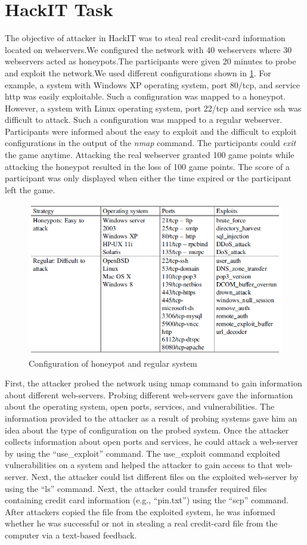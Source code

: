 \section{HackIT Task}
The objective of attacker in HackIT was to steal real credit-card information located on webservers.We configured the network with 40 webservers where 30 webservers acted as honeypots.The participants were given 20 minutes to probe and exploit the network.We used different configurations shown in \ref{fig:figure7}. For example, a system with Windows XP operating system, port 80/tcp, and service http was easily exploitable. Such a configuration was mapped to a honeypot. However, a system with Linux operating system, port 22/tcp and service ssh was difficult to
attack. Such a configuration was mapped to a regular webserver. Participants were informed about the easy to exploit and the difficult to exploit configurations in the output of the \textit{nmap} command. The participants could \textit{exit} the game anytime. Attacking the real webserver granted 100 game points while attacking the honeypot resulted in the loss of 100 game points. The score of a participant was only displayed when either the time expired or the participant left the game.

\FloatBarrier
\begin{figure}[!htbp]
\centering
  \includegraphics[scale=0.6]{Chap3/exploits.PNG}
  \caption{Configuration of honeypot and regular system}\label{fig:figure7}
\end{figure} 
First, the attacker probed the network using nmap command to gain information about different web-servers. Probing different web-servers gave the information about the operating system, open ports, services, and vulnerabilities. The information provided to the attacker as a result of probing systems gave him an idea about the type of configuration on the probed system. Once the attacker collects information about open ports and services, he could attack a web-server by using the \enquote{use\_exploit} command.
The use\_exploit command exploited vulnerabilities on a system and helped the attacker to gain access to that web-server. Next, the attacker could list different files on the exploited web-server by using the “ls” command. Next, the attacker could transfer required files containing credit card information (e.g., \enquote{pin.txt}) using the \enquote{scp} command. After attackers copied the file from the exploited system, he was informed whether he was successful or not in stealing a real credit-card file from the computer via a text-based feedback.
